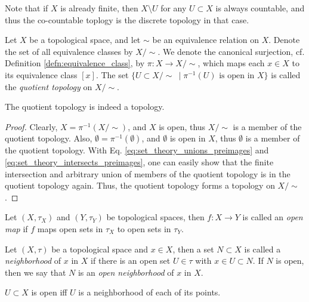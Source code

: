 \begin{remark}
	Note that if $X$ is already finite, then $X\setminus U$ for any $U\subset X$ is always countable, and thus the co-countable toplogy is the discrete topology in that case.
\end{remark}

\begin{defn}
	Let $X$ be a topological space, and let $\sim$ be an equivalence relation on $X$. Denote the set of all equivalence classes by $X/\sim$. We denote the canonical surjection, cf. Definition \ref{defn:equivalence_class}, by $\pi: X\to X/\sim$, which maps each $x\in X$ to its equivalence class $[x]$. The set $\{U \subset X/\sim\ \mid \pi^{-1}(U) \text{ is open in } X\}$ is called the \textit{quotient topology} on $X/\sim$.
\end{defn}

\begin{remark}
	The quotient topology is indeed a topology.
\end{remark}

\begin{proof}
	Clearly, $X = \pi^{-1}(X/\sim)$, and $X$ is open, thus $X/\sim$ is a member of the quotient topology. Also, $\emptyset = \pi^{-1}(\emptyset)$, and $\emptyset$ is open in $X$, thus $\emptyset$ is a member of the quotient topology. With Eq. \eqref{eq:set_theory_unions_preimages} and \eqref{eq:set_theory_intersects_preimages}, one can easily show that the finite intersection and arbitrary union of members of the quotient topology is in the quotient topology again. Thus, the quotient topology forms a topology on $X/\sim$.
\end{proof}

\begin{defn}\label{defn:open_map}
	Let $(X, \tau_X)$ and $(Y, \tau_Y)$ be topological spaces, then $f: X \to Y$ is called an \textit{open map} if $f$ maps open sets in $\tau_X$ to open sets in $\tau_Y$.
\end{defn}

\begin{defn}
	Let $(X, \tau)$ be a topological space and $x\in X$, then a set $N\subset X$ is called a \textit{neighborhood} of $x$ in $X$ if there is an open set $U\in\tau$ with $x\in U\subset N$. If $N$ is open, then we say that $N$ is an \textit{open neighborhood} of $x$ in $X$. 
\end{defn}

\begin{theorem}\label{thrm:open_via_nbd}
	$U\subset X$ is open iff $U$ is a neighborhood of each of its points.
\end{theorem}

